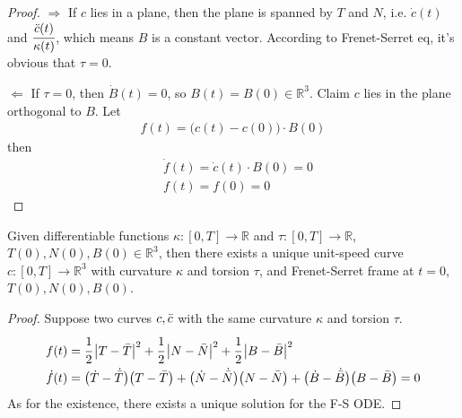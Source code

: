 \documentclass[10pt]{article}
\begin{document}
            \begin{proof}
                $\Longrightarrow$ If $c$ lies in a plane, then the plane is spanned by $T$ and $N$, i.e. $\dot{c}(t)$ and $\cfrac{\ddot{c}(t)}{\kappa(t)}$, which means $B$ is a constant vector. According to Frenet-Serret eq, it's obvious that $\tau = 0$.
            
                $\Longleftarrow$ If $\tau = 0$, then $\dot{B}(t) = 0$, so $B(t) = B(0)\in\mathbb{R}^3$. Claim $c$ lies in the plane orthogonal to $B$. Let
                \begin{equation*}
                    \begin{aligned}
                        f(t) = \bigg( c(t) - c(0) \bigg)\cdot B(0)
                    \end{aligned}
                \end{equation*}
                then
                \begin{equation*}
                    \begin{aligned}
                        &\dot{f}(t) = \dot{c}(t)\cdot B(0) = 0 \\
                        &f(t) = f(0) = 0
                    \end{aligned}
                \end{equation*}
            \end{proof}

            \begin{theorem}
                Given differentiable functions $\kappa: [0, T]\rightarrow\mathbb{R}$ and $\tau: [0, T]\rightarrow\mathbb{R}$, $T(0), N(0), B(0)\in\mathbb{R}^3$, then there exists a unique unit-speed curve $c: [0,T]\rightarrow\mathbb{R}^3$ with curvature $\kappa$ and torsion $\tau$, and Frenet-Serret frame at $t = 0$, $T(0), N(0), B(0)$.
             \end{theorem}
             \begin{proof}
                 Suppose two curves $c, \Bar{c}$ with the same curvature $\kappa$ and torsion $\tau$.
                 \begin{equation*}
                     \begin{aligned}
                         &f(t) = \cfrac{1}{2}\thinspace\big|T-\Bar{T}\big|^2 + \cfrac{1}{2}\thinspace\big|N-\Bar{N}\big|^2 + \cfrac{1}{2}\thinspace\big|B-\Bar{B}\big|^2 \\
                         &\dot{f}(t) = \big(\dot{T} - \dot{\Bar{T}}\big)\big(T-\Bar{T}\big) + \big(\dot{N} - \dot{\Bar{N}}\big)\big(N-\Bar{N}\big) + \big(\dot{B} - \dot{\Bar{B}}\big)\big(B-\Bar{B}\big) = 0
                     \end{aligned}
                 \end{equation*}
                 As for the existence, there exists a unique solution for the F-S ODE.
             \end{proof}
            
\end{document}

